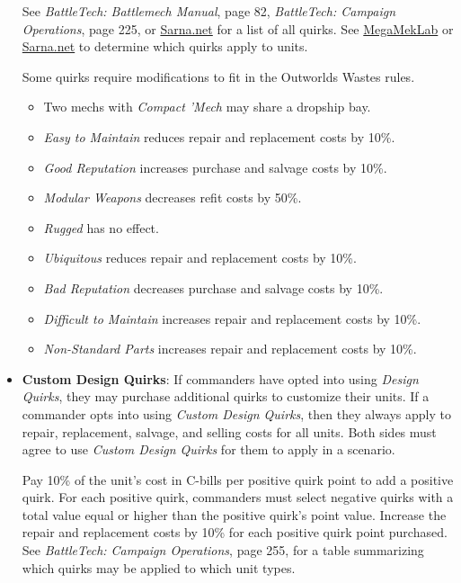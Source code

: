 \documentclass{article}
\begin{document}
\begin{itemize}
See \emph{BattleTech: Battlemech Manual}, page 82, \emph{BattleTech: Campaign Operations}, page 225, or \href{https://sarna.net}{Sarna.net} for a list of all quirks.
See \href{https://megamek.org}{MegaMekLab} or \href{https://sarna.net}{Sarna.net} to determine which quirks apply to units.

Some quirks require modifications to fit in the Outworlds Wastes rules.

\begin{itemize}

\item Two mechs with \emph{Compact 'Mech} may share a dropship bay.

\item \emph{Easy to Maintain} reduces repair and replacement costs by 10\%.

\item \emph{Good Reputation} increases purchase and salvage costs by 10\%.

\item \emph{Modular Weapons} decreases refit costs by 50\%.

\item \emph{Rugged} has no effect.

\item \emph{Ubiquitous} reduces repair and replacement costs by 10\%.

\item \emph{Bad Reputation} decreases purchase and salvage costs by 10\%.

\item \emph{Difficult to Maintain} increases repair and replacement costs by 10\%.

\item \emph{Non-Standard Parts} increases repair and replacement costs by 10\%.

\end{itemize}

\item {\bf Custom Design Quirks}: If commanders have opted into using \emph{Design Quirks}, they may purchase additional quirks to customize their units.
If a commander opts into using \emph{Custom Design Quirks}, then they always apply to repair, replacement, salvage, and selling costs for all units.
Both sides must agree to use \emph{Custom Design Quirks} for them to apply in a scenario.

Pay 10\% of the unit's cost in C-bills per positive quirk point to add a positive quirk.
For each positive quirk, commanders must select negative quirks with a total value equal or higher than the positive quirk's point value.
Increase the repair and replacement costs by 10\% for each positive quirk point purchased.
See \emph{BattleTech: Campaign Operations}, page 255, for a table summarizing which quirks may be applied to which unit types.


\end{itemize}
\end{document}
